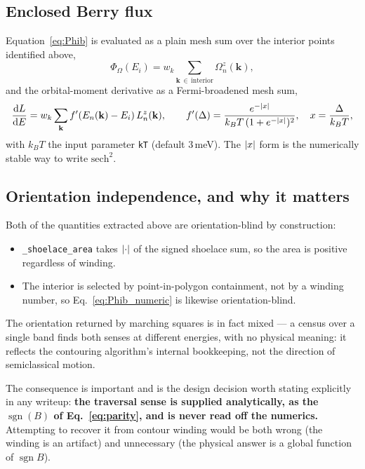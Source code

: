 \documentclass[11pt]{article}
\newcommand{\kb}{\mathbf{k}}
\newcommand{\Om}{\Omega}
\newcommand{\Bfield}{B}
\newcommand{\sgn}{\operatorname{sgn}}
\newcommand{\Phib}{\Phi_{\!\Om}}
\newcommand{\code}[1]{\texttt{#1}}
\begin{document}
\subsection{Enclosed Berry flux}

Equation~\eqref{eq:Phib} is evaluated as a plain mesh sum over the
interior points identified above,
\begin{equation}\label{eq:Phib_numeric}
  \Phib(E_i) = w_k \sum_{\kb \,\in\, \text{interior}} \Om_n^z(\kb),
\end{equation}
and the orbital-moment derivative as a Fermi-broadened mesh sum,
\begin{equation}
  \dv{L}{E}(E_i) = w_k \sum_{\kb} f'(E_n(\kb) - E_i)\, L_n^z(\kb),
  \qquad
  f'(\Delta) = \frac{e^{-\abs{x}}}{k_BT\,(1+e^{-\abs{x}})^2},
  \quad x = \frac{\Delta}{k_BT},
\end{equation}
with $k_BT$ the input parameter \code{kT} (default $3\,$meV).  The
$\abs{x}$ form is the numerically stable way to write
$\mathrm{sech}^2$.

\subsection{Orientation independence, and why it matters}
\label{sec:orientation}

Both of the quantities extracted above are orientation-blind by
construction:
\begin{itemize}
\item \code{\_shoelace\_area} takes $\abs{\cdot}$ of the signed shoelace
  sum, so the area is positive regardless of winding.
\item The interior is selected by point-in-polygon containment, not by a
  winding number, so Eq.~\eqref{eq:Phib_numeric} is likewise
  orientation-blind.
\end{itemize}
The orientation returned by marching squares is in fact mixed --- a
census over a single band finds both senses at different energies, with
no physical meaning: it reflects the contouring algorithm's internal
bookkeeping, not the direction of semiclassical motion.

The consequence is important and is the design decision worth stating
explicitly in any writeup: \textbf{the traversal sense is supplied
analytically, as the $\sgn(\Bfield)$ of Eq.~\eqref{eq:parity}, and is
never read off the numerics.}  Attempting to recover it from contour
winding would be both wrong (the winding is an artifact) and
unnecessary (the physical answer is a global function of $\sgn\Bfield$).
\end{document}
